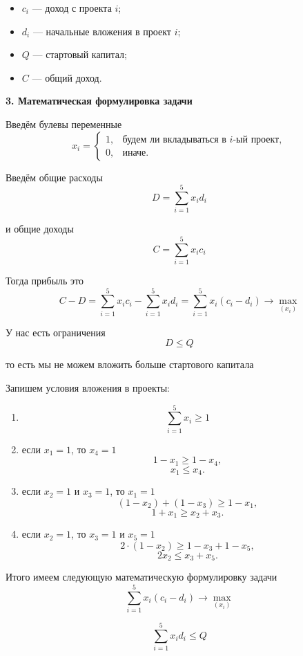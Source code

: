 \begin{itemize}
	\item $c_i$ --- доход с проекта $i$;
	
	\item $d_i$ --- начальные вложения в проект $i$;
	
	\item $Q$ --- стартовый капитал;
	
	\item $C$ --- общий доход.
\end{itemize}

\textbf{3. Математическая формулировка задачи}

Введём булевы переменные
\[
x_i = \begin{cases}
	1, & \text{будем ли вкладываться в $i$-ый проект}, \\
	0, & \text{иначе}.
\end{cases}
\]

Введём общие расходы
\[
D = \sum_{i=1}^5 x_i d_i
\]

и общие доходы
\[
C = \sum_{i=1}^5 x_i c_i
\]

Тогда прибыль это
\[
C - D = \sum_{i=1}^5 x_i c_i - \sum_{i=1}^5 x_i d_i = \sum_{i=1}^5 x_i (c_i - d_i) \to \max_{(x_i)}
\]

У нас есть ограничения
\[
D \le Q
\]

то есть мы не можем вложить больше стартового капитала

Запишем условия вложения в проекты:
\begin{enumerate}
	\item 
	
	\[
	\sum_{i=1}^{5} x_i \ge 1
	\]
	
	\item если $x_1 = 1$, то $x_4 = 1$
	\[
	1 - x_1 \ge 1 - x_4,
	\]
	\[
	x_1 \le x_4.	
	\]
	
	\item если $x_2 = 1$ и $x_3 = 1$, то $x_1 = 1$
	\[
	(1 - x_2) + (1 - x_3) \ge 1 - x_1,
	\]
	\[
	1 + x_1 \ge x_2 + x_3.
	\]
	
	\item если $x_2 = 1$, то $x_3 = 1$ и $x_5 = 1$
	\[
	2 \cdot (1 - x_2) \ge 1 - x_3 + 1 - x_5,
	\]
	\[
	2x_2 \le x_3 + x_5.
	\]
\end{enumerate}

Итого имеем следующую математическую формулировку задачи
\[
\sum_{i=1}^5 x_i (c_i - d_i) \to \max_{(x_i)}
\]

\[
\sum_{i=1}^5 x_i d_i \le Q
\]


